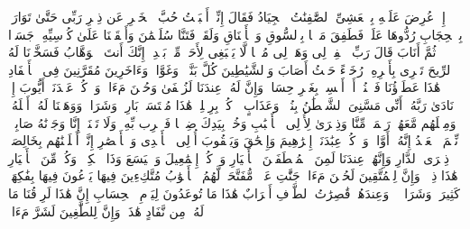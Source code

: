 \startbuffer[\q:38:31]
إِذۡ عُرِضَ عَلَیۡهِ بِٱلۡعَشِیِّ ٱلصَّٰفِنَٰتُ ٱلۡجِیَادُ%
\stopbuffer
\startbuffer[\q:38:32]
فَقَالَ إِنِّیۤ أَحۡبَبۡتُ حُبَّ ٱلۡخَیۡرِ عَن ذِكۡرِ رَبِّی حَتَّىٰ تَوَارَتۡ بِٱلۡحِجَابِ%
\stopbuffer
\startbuffer[\q:38:33]
رُدُّوهَا عَلَیَّۖ فَطَفِقَ مَسۡحَۢا بِٱلسُّوقِ وَٱلۡأَعۡنَاقِ%
\stopbuffer
\startbuffer[\q:38:34]
وَلَقَدۡ فَتَنَّا سُلَیۡمَٰنَ وَأَلۡقَیۡنَا عَلَىٰ كُرۡسِیِّهِۦ جَسَدࣰا ثُمَّ أَنَابَ%
\stopbuffer
\startbuffer[\q:38:35]
قَالَ رَبِّ ٱغۡفِرۡ لِی وَهَبۡ لِی مُلۡكࣰا لَّا یَنۢبَغِی لِأَحَدࣲ مِّنۢ بَعۡدِیۤۖ إِنَّكَ أَنتَ ٱلۡوَهَّابُ%
\stopbuffer
\startbuffer[\q:38:36]
فَسَخَّرۡنَا لَهُ ٱلرِّیحَ تَجۡرِی بِأَمۡرِهِۦ رُخَاۤءً حَیۡثُ أَصَابَ%
\stopbuffer
\startbuffer[\q:38:37]
وَٱلشَّیَٰطِینَ كُلَّ بَنَّاۤءࣲ وَغَوَّاصࣲ%
\stopbuffer
\startbuffer[\q:38:38]
وَءَاخَرِینَ مُقَرَّنِینَ فِی ٱلۡأَصۡفَادِ%
\stopbuffer
\startbuffer[\q:38:39]
هَٰذَا عَطَاۤؤُنَا فَٱمۡنُنۡ أَوۡ أَمۡسِكۡ بِغَیۡرِ حِسَابࣲ%
\stopbuffer
\startbuffer[\q:38:40]
وَإِنَّ لَهُۥ عِندَنَا لَزُلۡفَىٰ وَحُسۡنَ مَءَابࣲ%
\stopbuffer
\startbuffer[\q:38:41]
وَٱذۡكُرۡ عَبۡدَنَاۤ أَیُّوبَ إِذۡ نَادَىٰ رَبَّهُۥۤ أَنِّی مَسَّنِیَ ٱلشَّیۡطَٰنُ بِنُصۡبࣲ وَعَذَابٍ%
\stopbuffer
\startbuffer[\q:38:42]
ٱرۡكُضۡ بِرِجۡلِكَۖ هَٰذَا مُغۡتَسَلُۢ بَارِدࣱ وَشَرَابࣱ%
\stopbuffer
\startbuffer[\q:38:43]
وَوَهَبۡنَا لَهُۥۤ أَهۡلَهُۥ وَمِثۡلَهُم مَّعَهُمۡ رَحۡمَةࣰ مِّنَّا وَذِكۡرَىٰ لِأُو۟لِی ٱلۡأَلۡبَٰبِ%
\stopbuffer
\startbuffer[\q:38:44]
وَخُذۡ بِیَدِكَ ضِغۡثࣰا فَٱضۡرِب بِّهِۦ وَلَا تَحۡنَثۡۗ إِنَّا وَجَدۡنَٰهُ صَابِرࣰاۚ نِّعۡمَ ٱلۡعَبۡدُ إِنَّهُۥۤ أَوَّابࣱ%
\stopbuffer
\startbuffer[\q:38:45]
وَٱذۡكُرۡ عِبَٰدَنَاۤ إِبۡرَٰهِیمَ وَإِسۡحَٰقَ وَیَعۡقُوبَ أُو۟لِی ٱلۡأَیۡدِی وَٱلۡأَبۡصَٰرِ%
\stopbuffer
\startbuffer[\q:38:46]
إِنَّاۤ أَخۡلَصۡنَٰهُم بِخَالِصَةࣲ ذِكۡرَى ٱلدَّارِ%
\stopbuffer
\startbuffer[\q:38:47]
وَإِنَّهُمۡ عِندَنَا لَمِنَ ٱلۡمُصۡطَفَیۡنَ ٱلۡأَخۡیَارِ%
\stopbuffer
\startbuffer[\q:38:48]
وَٱذۡكُرۡ إِسۡمَٰعِیلَ وَٱلۡیَسَعَ وَذَا ٱلۡكِفۡلِۖ وَكُلࣱّ مِّنَ ٱلۡأَخۡیَارِ%
\stopbuffer
\startbuffer[\q:38:49]
هَٰذَا ذِكۡرࣱۚ وَإِنَّ لِلۡمُتَّقِینَ لَحُسۡنَ مَءَابࣲ%
\stopbuffer
\startbuffer[\q:38:50]
جَنَّٰتِ عَدۡنࣲ مُّفَتَّحَةࣰ لَّهُمُ ٱلۡأَبۡوَٰبُ%
\stopbuffer
\startbuffer[\q:38:51]
مُتَّكِءِینَ فِیهَا یَدۡعُونَ فِیهَا بِفَٰكِهَةࣲ كَثِیرَةࣲ وَشَرَابࣲ%
\stopbuffer
\startbuffer[\q:38:52]
۞ وَعِندَهُمۡ قَٰصِرَٰتُ ٱلطَّرۡفِ أَتۡرَابٌ%
\stopbuffer
\startbuffer[\q:38:53]
هَٰذَا مَا تُوعَدُونَ لِیَوۡمِ ٱلۡحِسَابِ%
\stopbuffer
\startbuffer[\q:38:54]
إِنَّ هَٰذَا لَرِزۡقُنَا مَا لَهُۥ مِن نَّفَادٍ%
\stopbuffer
\startbuffer[\q:38:55]
هَٰذَاۚ وَإِنَّ لِلطَّٰغِینَ لَشَرَّ مَءَابࣲ%
\stopbuffer
\startbuffer[\q:38:56]
